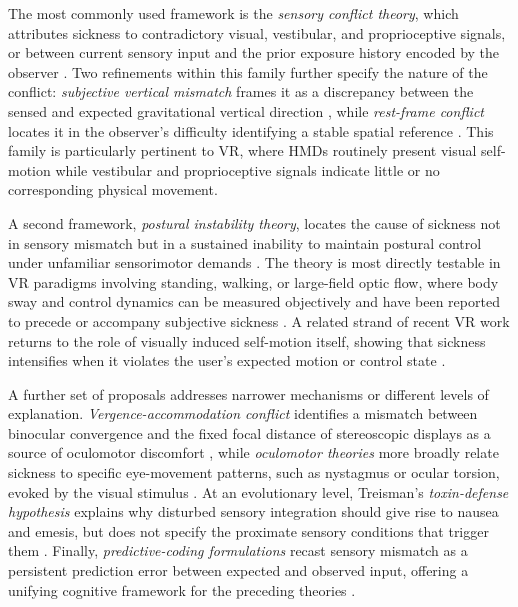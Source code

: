 The most commonly used framework is the \textit{sensory conflict theory}, which attributes sickness to contradictory visual, vestibular, and proprioceptive signals, or between current sensory input and the prior exposure history encoded by the observer \cite{reasonMotionSickness1975, reasonMotionSicknessAdaptation1978, omanMotionSicknessSynthesis1990}.
Two refinements within this family further specify the nature of the conflict: \textit{subjective vertical mismatch} frames it as a discrepancy between the sensed and expected gravitational vertical direction \cite{blesMotionSicknessOnly1998}, while \textit{rest-frame conflict} locates it in the observer's difficulty identifying a stable spatial reference \cite{protheroUnifiedApproachPresence2003}.
This family is particularly pertinent to VR, where HMDs routinely present visual self-motion while vestibular and proprioceptive signals indicate little or no corresponding physical movement.

A second framework, \textit{postural instability theory}, locates the cause of sickness not in sensory mismatch but in a sustained inability to maintain postural control under unfamiliar sensorimotor demands \cite{riccioEcologicalTheoryMotion1991, stoffregenPosturalInstabilityPrecedes1998}.
The theory is most directly testable in VR paradigms involving standing, walking, or large-field optic flow, where body sway and control dynamics can be measured objectively and have been reported to precede or accompany subjective sickness \cite{cortesEEGbasedExperimentVR2023}.
A related strand of recent VR work returns to the role of visually induced self-motion itself, showing that sickness intensifies when it violates the user's expected motion or control state \cite{teixeiraUnexpectedVectionExacerbates2022, teixeiraInvestigatingRelativeContributions2024}.

A further set of proposals addresses narrower mechanisms or different levels of explanation.
\textit{Vergence-accommodation conflict} identifies a mismatch between binocular convergence and the fixed focal distance of stereoscopic displays as a source of oculomotor discomfort \cite{kramidaResolvingVergenceAccommodationConflict2016}, while \textit{oculomotor theories} more broadly relate sickness to specific eye-movement patterns, such as nystagmus or ocular torsion, evoked by the visual stimulus \cite{ebenholtzMotionSicknessOculomotor1992}.
At an evolutionary level, Treisman's \textit{toxin-defense hypothesis} explains why disturbed sensory integration should give rise to nausea and emesis, but does not specify the proximate sensory conditions that trigger them \cite{treismanMotionSicknessEvolutionary1977}.
Finally, \textit{predictive-coding formulations} recast sensory mismatch as a persistent prediction error between expected and observed input, offering a unifying cognitive framework for the preceding theories \cite{nurnbergerMismatchVisualVestibularInformation2021}.

